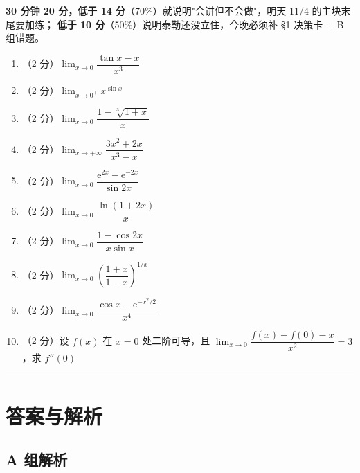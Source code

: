 \documentclass[11pt,a4paper]{ctexart}
\newcommand{\ee}{\mathrm{e}}
\begin{document}
\begin{keypoint}[验收线]
\textbf{30 分钟 20 分，低于 14 分}（70\%）就说明"会讲但不会做"，明天 11/4 的主块末尾要加练；
\textbf{低于 10 分}（50\%）说明泰勒还没立住，今晚必须补 §1 决策卡 + B 组错题。
\end{keypoint}

\begin{enumerate}[label=\textbf{L\arabic*.}]
  \item （2 分）$\displaystyle \lim_{x\to0}\dfrac{\tan x-x}{x^{3}}$
  \item （2 分）$\displaystyle \lim_{x\to0^{+}}x^{\sin x}$
  \item （2 分）$\displaystyle \lim_{x\to0}\dfrac{1-\sqrt[3]{1+x}}{x}$
  \item （2 分）$\displaystyle \lim_{x\to+\infty}\dfrac{3x^{2}+2x}{x^{3}-x}$
  \item （2 分）$\displaystyle \lim_{x\to0}\dfrac{\ee^{2x}-\ee^{-2x}}{\sin 2x}$
  \item （2 分）$\displaystyle \lim_{x\to0}\dfrac{\ln(1+2x)}{x}$
  \item （2 分）$\displaystyle \lim_{x\to0}\dfrac{1-\cos 2x}{x\sin x}$
  \item （2 分）$\displaystyle \lim_{x\to0}\left(\dfrac{1+x}{1-x}\right)^{1/x}$
  \item （2 分）$\displaystyle \lim_{x\to0}\dfrac{\cos x-\ee^{-x^{2}/2}}{x^{4}}$
  \item （2 分）设 $f(x)$ 在 $x=0$ 处二阶可导，且
        $\displaystyle \lim_{x\to0}\dfrac{f(x)-f(0)-x}{x^{2}}=3$，求 $f''(0)$
\end{enumerate}

\vspace{2em}
\noindent\rule{\textwidth}{0.4pt}
\newpage

\section{答案与解析}

\subsection{A 组解析}
\end{document}
